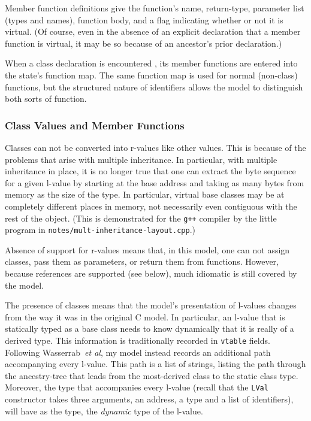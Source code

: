 \documentclass[11pt]{article}
\begin{document}
Member function definitions give the function's name, return-type,
parameter list (types and names), function body, and a flag indicating
whether or not it is virtual.  (Of course, even in the absence of an
explicit declaration that a member function is virtual, it may be so
because of an ancestor's prior declaration.) 

When a class declaration is encountered , its member functions are
entered into the state's function map.  The same function map is used
for normal (non-class) functions, but the structured nature of \cpp{}
identifiers allows the model to distinguish both sorts of function. 

\subsubsection{Class Values and Member Functions}
\label{sec:class-values}
Classes can not be converted into r-values like other values.  This is
because of the problems that arise with multiple inheritance.  In
particular, with multiple inheritance in place, it is no longer true
that one can extract the byte sequence for a given l-value by starting
at the base address and taking as many bytes from memory as the size
of the type.  In particular, virtual base classes may be at completely
different places in memory, not necessarily even contiguous with the
rest of the object.  (This is demonstrated for the \texttt{g++}
compiler by the little program in
\texttt{notes/mult-inheritance-layout.cpp}.)

Absence of support for r-values means that, in this model, one can not
assign classes, pass them as parameters, or return them from
functions.  However, because references are supported (see below),
much idiomatic \cpp{} is still covered by the model.

%
The presence of classes means that the model's presentation of
l-values changes from the way it was in the original C model.  In
particular, an l-value that is statically typed as a base class needs
to know dynamically that it is really of a derived type.  This
information is traditionally recorded in \texttt{vtable} fields.
Following Wasserrab~\emph{et al}, my model instead records an
additional path accompanying every l-value.  This path is a list of
strings, listing the path through the ancestry-tree that leads from
the most-derived class to the static class type.  Moreover, the type
that accompanies every l-value (recall that the \texttt{LVal}
constructor takes three arguments, an address, a type and a list of
identifiers), will have as the type, the \emph{dynamic} type
of the l-value.
\end{document}
